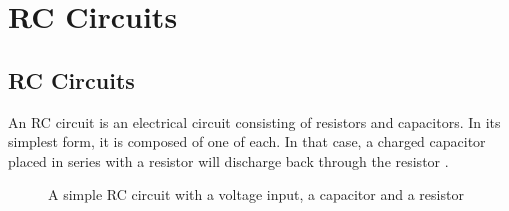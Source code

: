 \chapter{RC Circuits} \label{chap:RC}
\section{RC Circuits}
An RC circuit is an electrical circuit consisting of resistors and capacitors. In its simplest form, it is composed of one of each. In that case, a charged capacitor placed in series with a resistor will discharge back through the resistor \cite[p~21]{artof}. 

\begin{figure}[H]
 
 \caption{A simple RC circuit with a voltage input, a capacitor and a resistor}
\end{figure}
